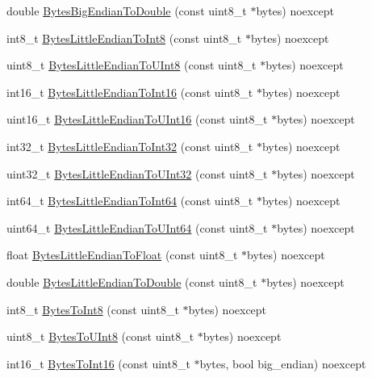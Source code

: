 \begin{DoxyCompactItemize}
double \hyperlink{namespacemage_a2249977337f5a26a5625a4c05345a062}{Bytes\+Big\+Endian\+To\+Double} (const uint8\+\_\+t $\ast$bytes) noexcept
\item 
int8\+\_\+t \hyperlink{namespacemage_a9153445c824967eb0805eeec7ac8fec5}{Bytes\+Little\+Endian\+To\+Int8} (const uint8\+\_\+t $\ast$bytes) noexcept
\item 
uint8\+\_\+t \hyperlink{namespacemage_a392a1bad181ddcc8c18b8ee988aa0f32}{Bytes\+Little\+Endian\+To\+U\+Int8} (const uint8\+\_\+t $\ast$bytes) noexcept
\item 
int16\+\_\+t \hyperlink{namespacemage_ae5931c351f796a402fc353b2ae26767f}{Bytes\+Little\+Endian\+To\+Int16} (const uint8\+\_\+t $\ast$bytes) noexcept
\item 
uint16\+\_\+t \hyperlink{namespacemage_a6ed6e28e917535c12c7ea48347d00b1e}{Bytes\+Little\+Endian\+To\+U\+Int16} (const uint8\+\_\+t $\ast$bytes) noexcept
\item 
int32\+\_\+t \hyperlink{namespacemage_a5923645c90b3b1d327e768ed89d07922}{Bytes\+Little\+Endian\+To\+Int32} (const uint8\+\_\+t $\ast$bytes) noexcept
\item 
uint32\+\_\+t \hyperlink{namespacemage_a5e26714f4f748035770b67c53af755a6}{Bytes\+Little\+Endian\+To\+U\+Int32} (const uint8\+\_\+t $\ast$bytes) noexcept
\item 
int64\+\_\+t \hyperlink{namespacemage_ae1d9127eb0d3efb51d1b010075b73c05}{Bytes\+Little\+Endian\+To\+Int64} (const uint8\+\_\+t $\ast$bytes) noexcept
\item 
uint64\+\_\+t \hyperlink{namespacemage_a5ad416b44d13c417c4cb17c2c6efdf1a}{Bytes\+Little\+Endian\+To\+U\+Int64} (const uint8\+\_\+t $\ast$bytes) noexcept
\item 
float \hyperlink{namespacemage_a833075fe8302c168037fd3ef2e9b9594}{Bytes\+Little\+Endian\+To\+Float} (const uint8\+\_\+t $\ast$bytes) noexcept
\item 
double \hyperlink{namespacemage_a45dd5f6cd34008b3325bd0d061a8f12b}{Bytes\+Little\+Endian\+To\+Double} (const uint8\+\_\+t $\ast$bytes) noexcept
\item 
int8\+\_\+t \hyperlink{namespacemage_aa7af0caa90c24b7ccf9a8f9990aa4dec}{Bytes\+To\+Int8} (const uint8\+\_\+t $\ast$bytes) noexcept
\item 
uint8\+\_\+t \hyperlink{namespacemage_a1e1d14b4aa22a5c6f52bb5e7b84d8357}{Bytes\+To\+U\+Int8} (const uint8\+\_\+t $\ast$bytes) noexcept
\item 
int16\+\_\+t \hyperlink{namespacemage_ac93940982cad2289841dd8ee876b15d6}{Bytes\+To\+Int16} (const uint8\+\_\+t $\ast$bytes, bool big\+\_\+endian) noexcept

\end{DoxyCompactItemize}
